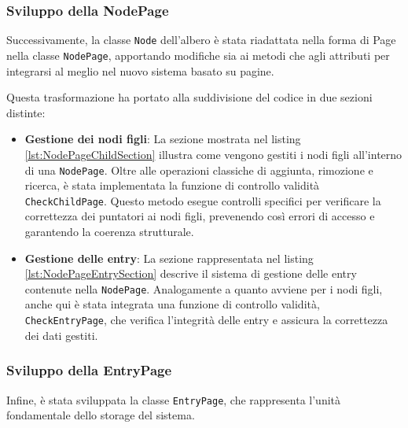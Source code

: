\documentclass[12pt,a4paper,openright,twoside]{book}
\begin{document}
            \subsubsection{Sviluppo della NodePage}

                Successivamente, la classe \texttt{Node} dell'albero è stata riadattata nella forma di Page nella classe \texttt{NodePage}, apportando modifiche sia ai metodi che agli attributi per integrarsi al meglio nel nuovo sistema basato su pagine.

                Questa trasformazione ha portato alla suddivisione del codice in due sezioni distinte:

                \begin{itemize}
                    \item \textbf{Gestione dei nodi figli}: La sezione mostrata nel listing \cref{lst:NodePageChildSection} illustra come vengono gestiti i nodi figli all'interno di una \texttt{NodePage}. Oltre alle operazioni classiche di aggiunta, rimozione e ricerca, è stata implementata la funzione di controllo validità \texttt{CheckChildPage}. Questo metodo esegue controlli specifici per verificare la correttezza dei puntatori ai nodi figli, prevenendo così errori di accesso e garantendo la coerenza strutturale.

                    \item \textbf{Gestione delle entry}: La sezione rappresentata nel listing \cref{lst:NodePageEntrySection} descrive il sistema di gestione delle entry contenute nella \texttt{NodePage}. Analogamente a quanto avviene per i nodi figli, anche qui è stata integrata una funzione di controllo validità, \texttt{CheckEntryPage}, che verifica l'integrità delle entry e assicura la correttezza dei dati gestiti.
                \end{itemize}

            

            

            \subsubsection{Sviluppo della EntryPage}

                Infine, è stata sviluppata la classe \texttt{EntryPage}, che rappresenta l'unità fondamentale dello storage del sistema.
\end{document}

